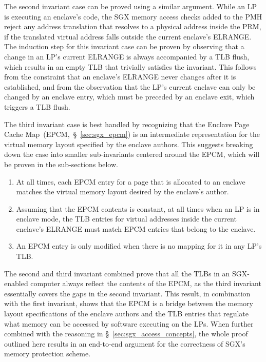 The second invariant case can be proved using a similar argument. While an LP
is executing an enclave's code, the SGX memory access checks added to the PMH
reject any address translation that resolves to a physical address inside the
PRM, if the translated virtual address falls outside the current enclave's
ELRANGE. The induction step for this invariant case can be proven by observing
that a change in an LP's current ELRANGE is always accompanied by a TLB flush,
which results in an empty TLB that trivially satisfies the invariant. This
follows from the constraint that an enclave's ELRANGE never changes after it is
established, and from the observation that the LP's current enclave can only be
changed by an enclave entry, which must be preceded by an enclave exit, which
triggers a TLB flush.

The third invariant case is best handled by recognizing that the Enclave Page
Cache Map~(EPCM,~\S~\ref{sec:sgx_epcm}) is an intermediate representation for
the virtual memory layout specified by the enclave authors. This suggests
breaking down the case into smaller sub-invariants centered around the EPCM,
which will be proven in the sub-sections below.

\begin{enumerate}
\item At all times, each EPCM entry for a page that is allocated to an enclave
  matches the virtual memory layout desired by the enclave's author.
\item Assuming that the EPCM contents is constant, at all times when an LP is
  in enclave mode, the TLB entries for virtual addresses inside the current
  enclave's ELRANGE must match EPCM entries that belong to the enclave.
\item An EPCM entry is only modified when there is no mapping for it in any
  LP's TLB.
\end{enumerate}

The second and third invariant combined prove that all the TLBs in an
SGX-enabled computer always reflect the contents of the EPCM, as the third
invariant essentially covers the gaps in the second invariant. This result, in
combination with the first invariant, shows that the EPCM is a bridge between
the memory layout specifications of the enclave authors and the TLB entries
that regulate what memory can be accessed by software executing on the LPs.
When further combined with the reasoning in \S~\ref{sec:sgx_access_concepts},
the whole proof outlined here results in an end-to-end argument for the
correctness of SGX's memory protection scheme.


